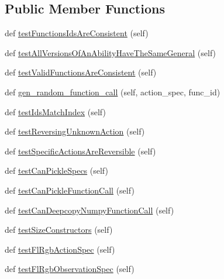 \subsection*{Public Member Functions}
\begin{DoxyCompactItemize}
\item 
def \mbox{\hyperlink{classpysc2_1_1lib_1_1features__test_1_1_features_test_ae155ba0432bbdf3c0637edde339a4bf3}{test\+Functions\+Ids\+Are\+Consistent}} (self)
\item 
def \mbox{\hyperlink{classpysc2_1_1lib_1_1features__test_1_1_features_test_a9caf3659f3783bd5cb55e47fea09fdf4}{test\+All\+Versions\+Of\+An\+Ability\+Have\+The\+Same\+General}} (self)
\item 
def \mbox{\hyperlink{classpysc2_1_1lib_1_1features__test_1_1_features_test_a174e0178a227e367c212dc99de396dab}{test\+Valid\+Functions\+Are\+Consistent}} (self)
\item 
def \mbox{\hyperlink{classpysc2_1_1lib_1_1features__test_1_1_features_test_af14dc6f548faff56839d0b6d2ffb0af9}{gen\+\_\+random\+\_\+function\+\_\+call}} (self, action\+\_\+spec, func\+\_\+id)
\item 
def \mbox{\hyperlink{classpysc2_1_1lib_1_1features__test_1_1_features_test_a4e3f221ce65b9d51eab877ba66bd8c9a}{test\+Ids\+Match\+Index}} (self)
\item 
def \mbox{\hyperlink{classpysc2_1_1lib_1_1features__test_1_1_features_test_ad4095c1ac9fa6ecfa7b0824eeb39972a}{test\+Reversing\+Unknown\+Action}} (self)
\item 
def \mbox{\hyperlink{classpysc2_1_1lib_1_1features__test_1_1_features_test_a47c11cce3301e4e196d58febbbfdca1b}{test\+Specific\+Actions\+Are\+Reversible}} (self)
\item 
def \mbox{\hyperlink{classpysc2_1_1lib_1_1features__test_1_1_features_test_aaa465371eb5f843df3b7d0b8b7b8e3c1}{test\+Can\+Pickle\+Specs}} (self)
\item 
def \mbox{\hyperlink{classpysc2_1_1lib_1_1features__test_1_1_features_test_a9dfbb6050949524fbe9eaddc307c60a9}{test\+Can\+Pickle\+Function\+Call}} (self)
\item 
def \mbox{\hyperlink{classpysc2_1_1lib_1_1features__test_1_1_features_test_aabcdc707b4f55ce05986959787f034c1}{test\+Can\+Deepcopy\+Numpy\+Function\+Call}} (self)
\item 
def \mbox{\hyperlink{classpysc2_1_1lib_1_1features__test_1_1_features_test_a55941b95526a89d67c4f1ac577bc6cac}{test\+Size\+Constructors}} (self)
\item 
def \mbox{\hyperlink{classpysc2_1_1lib_1_1features__test_1_1_features_test_abd061b800bbe5cc61f11740d27411fb4}{test\+Fl\+Rgb\+Action\+Spec}} (self)
\item 
def \mbox{\hyperlink{classpysc2_1_1lib_1_1features__test_1_1_features_test_a9b48fdd9a34b1891d18561867d4cd7a8}{test\+Fl\+Rgb\+Observation\+Spec}} (self)
\end{DoxyCompactItemize}


